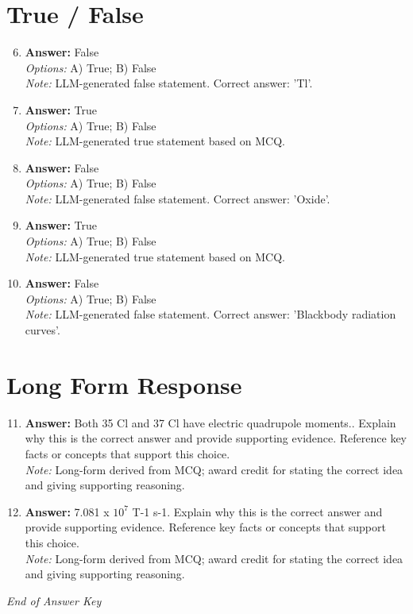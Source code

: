 \documentclass[12pt]{article}
\begin{document}
\section*{True / False}
\begin{enumerate}[label=\arabic*.]
\setcounter{enumi}{5}
\item \textbf{Answer:} False
\\ \textit{Options:} A) True; B) False
\\ \textit{Note:} LLM-generated false statement. Correct answer: 'Tl'.
\item \textbf{Answer:} True
\\ \textit{Options:} A) True; B) False
\\ \textit{Note:} LLM-generated true statement based on MCQ.
\item \textbf{Answer:} False
\\ \textit{Options:} A) True; B) False
\\ \textit{Note:} LLM-generated false statement. Correct answer: 'Oxide'.
\item \textbf{Answer:} True
\\ \textit{Options:} A) True; B) False
\\ \textit{Note:} LLM-generated true statement based on MCQ.
\item \textbf{Answer:} False
\\ \textit{Options:} A) True; B) False
\\ \textit{Note:} LLM-generated false statement. Correct answer: 'Blackbody radiation curves'.
\end{enumerate}

\section*{Long Form Response}
\begin{enumerate}[label=\arabic*.]
\setcounter{enumi}{10}
\item \textbf{Answer:} Both 35 Cl and 37 Cl have electric quadrupole moments.. Explain why this is the correct answer and provide supporting evidence. Reference key facts or concepts that support this choice.
\\ \textit{Note:} Long-form derived from MCQ; award credit for stating the correct idea and giving supporting reasoning.
\item \textbf{Answer:} 7.081 x $10^7$ T-1 s-1. Explain why this is the correct answer and provide supporting evidence. Reference key facts or concepts that support this choice.
\\ \textit{Note:} Long-form derived from MCQ; award credit for stating the correct idea and giving supporting reasoning.
\end{enumerate}

\vfill
\noindent\textit{End of Answer Key}
\end{document}

